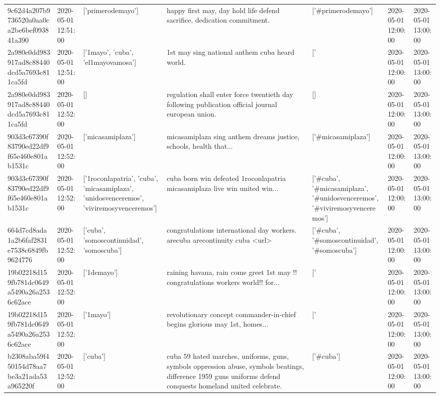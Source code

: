 \begin{tabular}{lllllll}
9c62d4a207b9736520a0aa0ca2be6bef093841a390 & 2020-05-01 12:51:00 & ['primerodemayo'] & happy first may, day hold life defend sacrifice, dedication commitment. & ['#primerodemayo'] & 2020-05-01 12:00:00 & 2020-05-01 13:00:00 \\
2a980e0dd983917ad8c88440dcd5a7693c811ca5fd & 2020-05-01 12:51:00 & ['1mayo', 'cuba', 'el1mayovamosa'] & 1st may sing national anthem cuba heard world. & ['#1mayo', '#cuba', '#el1mayovamosa'] & 2020-05-01 12:00:00 & 2020-05-01 13:00:00 \\
2a980e0dd983917ad8c88440dcd5a7693c811ca5fd & 2020-05-01 12:52:00 & [] & regulation shall enter force twentieth day following publication official journal european union. & [] & 2020-05-01 12:00:00 & 2020-05-01 13:00:00 \\
903d3c67390f83790ed22df9f65e460e801ab1531c & 2020-05-01 12:52:00 & ['micasamiplaza'] & micasamiplaza sing anthem dreams justice, schools, health that... & ['#micasamiplaza'] & 2020-05-01 12:00:00 & 2020-05-01 13:00:00 \\
903d3c67390f83790ed22df9f65e460e801ab1531c & 2020-05-01 12:52:00 & ['1roconlapatria', 'cuba', 'micasamiplaza', 'unidosvenceremos', 'viviremosyvenceremos'] & cuba born win defeated 1roconlapatria micasamiplaza live win united win... & ['#cuba', '#micasamiplaza', '#unidosvenceremos', '#viviremosyvenceremos'] & 2020-05-01 12:00:00 & 2020-05-01 13:00:00 \\
664d7cd8ada1a2b6faf2831e7538c6849fb9624776 & 2020-05-01 12:52:00 & ['cuba', 'somoscontinuidad', 'somoscuba'] & congratulations international day workers. arecuba arecontinuity cuba <url> & ['#cuba', '#somoscontinuidad', '#somoscuba'] & 2020-05-01 12:00:00 & 2020-05-01 13:00:00 \\
19b02218d159fb781dc0649a5490a26a2536c62ace & 2020-05-01 12:52:00 & ['1demayo'] & raining havana, rain come greet 1st may !! congratulations workers world!! for... & ['#1demayo'] & 2020-05-01 12:00:00 & 2020-05-01 13:00:00 \\
19b02218d159fb781dc0649a5490a26a2536c62ace & 2020-05-01 12:52:00 & ['1mayo'] & revolutionary concept commander-in-chief begins glorious may 1st, homes... & ['#1mayo'] & 2020-05-01 12:00:00 & 2020-05-01 13:00:00 \\
b2308aba59f450154d78aa7be3a21ada53a965220f & 2020-05-01 12:52:00 & ['cuba'] & cuba 59 hated marches, uniforms, guns, symbols oppression abuse, symbols beatings, difference 1959 guns uniforms defend conquests homeland united celebrate. & ['#cuba'] & 2020-05-01 12:00:00 & 2020-05-01 13:00:00 \\

\end{tabular}
